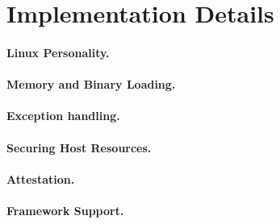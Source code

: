 \section{Implementation Details}

\paragraph{Linux Personality.}

\paragraph{Memory and Binary Loading.}

\paragraph{Exception handling.}

\paragraph{Securing Host Resources.}

\paragraph{Attestation.}

\paragraph{Framework Support.}

